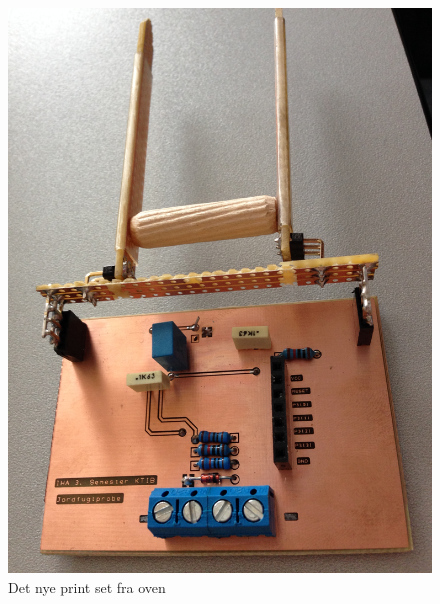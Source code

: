 \begin{figure}[H]
	\centering 
\includegraphics[scale=0.08]{HardwareArkitektur/Sensore/Jordfugt_billeder/print_ny_top.JPG}
	\caption{Det nye print set fra oven}
	\label{photo:print_ny_top}
\end{figure} 

